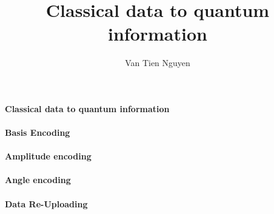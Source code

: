\documentclass[10pt,article]{IEEEtran}
\title{Classical data to quantum information}
\author{Van Tien Nguyen}
\begin{document}
\maketitle

\paragraph{Classical data to quantum information}

\paragraph{Basis Encoding}

\paragraph{Amplitude encoding}

\paragraph{Angle encoding}

\paragraph{Data Re-Uploading}



\end{document}
